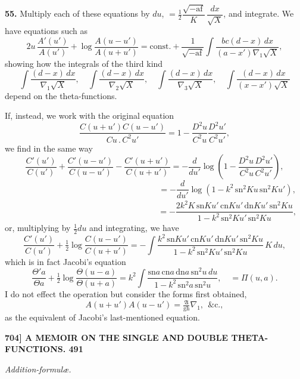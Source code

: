 \documentclass[11pt]{article}
\newcommand{\Ag}{\mathfrak{A}}
\begin{document}
\medskip
\textbf{55.} Multiply each of these equations by $du$, $=\tfrac{1}{2}\dfrac{\sqrt{-\mathrm{a}\mathrm{f}}}{K}\,\dfrac{dx}{\sqrt{X}}$, and integrate. We have equations such as
\[
2u\,\frac{A'(u')}{A(u')} + \log\frac{A(u-u')}{A(u+u')} = \text{const.} + \frac{1}{\sqrt{-\mathrm{a}\mathrm{f}}}\int\frac{bc(d-x)\,dx}{(a-x')\nabla_1\sqrt{X}},
\]
showing how the integrals of the third kind
\[
\int\frac{(d-x)\,dx}{\nabla_1\sqrt{X}},\quad \int\frac{(d-x)\,dx}{\nabla_2\sqrt{X}},\quad \int\frac{(d-x)\,dx}{\nabla_3\sqrt{X}},\quad \int\frac{(d-x)\,dx}{(x-x')\sqrt{X}}
\]
depend on the theta-functions.

If, instead, we work with the original equation
\[
\frac{C(u+u')C(u-u')}{Cu\,.\,C^2 u'} = 1 - \frac{D^2 u}{C^2 u}\frac{D^2 u'}{C^2 u'},
\]
we find in the same way
\[
\frac{C'(u')}{C(u')} + \frac{C'(u-u')}{C(u-u')} - \frac{C'(u+u')}{C(u+u')} = -\frac{d}{du'}\log\!\left(1 - \frac{D^2 u\,D^2 u'}{C^2 u\,C^2 u'}\right),
\]
\[
\phantom{\frac{C'(u')}{C(u')} + \frac{C'(u-u')}{C(u-u')} - \frac{C'(u+u')}{C(u+u')}} = -\frac{d}{du'}\log(1 - k^2\,\mathrm{sn}^2 Ku\,\mathrm{sn}^2 Ku'),
\]
\[
\phantom{\frac{C'(u')}{C(u')} + \frac{C'(u-u')}{C(u-u')} - \frac{C'(u+u')}{C(u+u')}} = -\frac{2k^2 K\,\mathrm{sn} Ku'\,\mathrm{cn} Ku'\,\mathrm{dn} Ku'\,\mathrm{sn}^2 Ku}{1 - k^2\,\mathrm{sn}^2 Ku'\,\mathrm{sn}^2 Ku},
\]
or, multiplying by $\tfrac{1}{2}du$ and integrating, we have
\[
\frac{C'(u')}{C(u')} + \tfrac{1}{2}\log\frac{C(u-u')}{C(u+u')} = -\!\int\!\frac{k^2\,\mathrm{sn} Ku'\,\mathrm{cn} Ku'\,\mathrm{dn} Ku'\,\mathrm{sn}^2 Ku}{1 - k^2\,\mathrm{sn}^2 Ku'\,\mathrm{sn}^2 Ku}\,K\,du,
\]
which is in fact Jacobi's equation
\[
\frac{\Theta'a}{\Theta a} + \tfrac{1}{2}\log\frac{\Theta(u-a)}{\Theta(u+a)} = k^2\!\int\!\frac{\mathrm{sn} a\,\mathrm{cn} a\,\mathrm{dn} a\,\mathrm{sn}^2 u\,du}{1 - k^2\,\mathrm{sn}^2 a\,\mathrm{sn}^2 u},\quad = \Pi(u,a).
\]
I do not effect the operation but consider the forms first obtained,
\[
A(u+u')A(u-u') = \tfrac{\Ag}{\mathrm{g}\mathrm{h}}\nabla_1,\ \ \&\text{c.},
\]
as the equivalent of Jacobi's last-mentioned equation.

\bigskip
\noindent\textbf{704] \hfill A MEMOIR ON THE SINGLE AND DOUBLE THETA-FUNCTIONS. \hfill 491}

\medskip
\begin{center}\textit{Addition-formul\ae.}\end{center}
\end{document}
